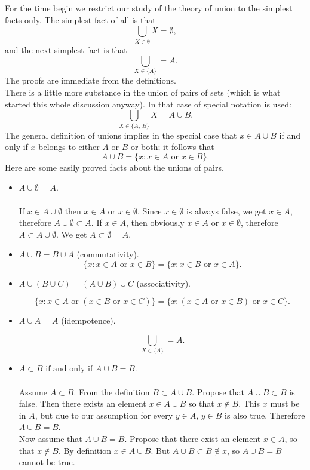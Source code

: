 For the time begin we restrict our study of the theory of union to the simplest facts only. The simplest fact of all is that
\[
	\bigcup_{X \in \emptyset} X = \emptyset,
\]
and the next simplest fact is that
\[
	\bigcup_{X \in \{A\}} = A.
\]
The proofs are immediate from the definitions.\\

There is a little more substance in the union of pairs of sets (which is what started this whole discussion anyway). In that case of special notation is used:
\[
	\bigcup_{X \in \{A, \, B\}} X = A \cup B.
\]
The general definition of unions implies in the special case that $x \in A \cup B$ if and only if $x$ belongs to either $A$ or $B$ or both; it follows that
\[
	A \cup B = \{ x : x \in A \text{ or } x \in B\}.
\]
Here are some easily proved facts about the unions of pairs.

\begin{itemize}
	\item $A \cup \emptyset = A$.\\\\
	If $x \in A \cup \emptyset$ then $x \in A \text{ or } x \in \emptyset$. Since $x \in \emptyset$ is always false, we get $x \in A$, therefore $A \cup \emptyset \subset A$. If $x \in A$, then obviously $x \in A \text{ or } x \in \emptyset$, therefore $A \subset A \cup \emptyset$. We get $A \subset \emptyset = A$.
	
	\item $A \cup B = B \cup A$ (commutativity).
	\[
		\{ x : x \in A \text{ or } x \in B \} = \{ x : x \in B \text{ or } x \in A \}.
	\]
	\item $A \cup (B \cup C) = (A \cup B) \cup C$ (associativity).
	
	\[
		\{ x : x \in A \text{ or } (x \in B \text{ or } x \in C) \} = \{ x : (x \in A \text{ or } x \in B) \text{ or } x \in C \}.
	\]
	
	\item $A \cup A = A$ (idempotence).
	
	\[
	\bigcup_{X \in \{A\}} = A.
	\]
	
	\item $A \subset B \text{ if and only if } A \cup B = B$.\\\\
	Assume $A \subset B$. From the definition $B \subset A \cup B$. Propose that $A \cup B \subset B$ is false. Then there exists an element $x \in A \cup B$ so that $x \not \in B$. This $x$ must be in $A$, but due to our assumption for every $y \in A$, $y \in B$ is also true. Therefore $A \cup B = B$.\\
	Now assume that $A \cup B = B$. Propose that there exist an element $x \in A$, so that $x \not \in B$. By definition $x \in A \cup B$. But $A \cup B \subset B \not \ni x$, so $A \cup B = B$ cannot be true.
\end{itemize}

